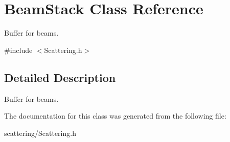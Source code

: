 \hypertarget{class_beam_stack}{}\section{Beam\+Stack Class Reference}
\label{class_beam_stack}


Buffer for beams.  




{\ttfamily \#include $<$Scattering.\+h$>$}



\subsection{Detailed Description}
Buffer for beams. 

The documentation for this class was generated from the following file\+:\begin{DoxyCompactItemize}
\item 
scattering/Scattering.\+h\end{DoxyCompactItemize}
